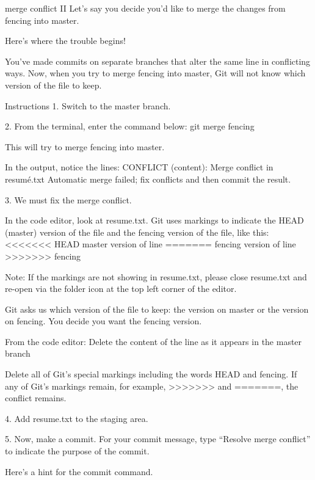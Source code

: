 merge conflict II
    Let’s say you decide you’d like to merge the changes from fencing into master.

    Here’s where the trouble begins!

    You’ve made commits on separate branches that alter the same line in conflicting ways. Now, when you try to merge fencing into master, Git will not know which version of the file to keep.

Instructions
    1.
    Switch to the master branch.

    2.
    From the terminal, enter the command below:
        git merge fencing
    
    This will try to merge fencing into master.

    In the output, notice the lines:
        CONFLICT (content): Merge conflict in resumé.txt
        Automatic merge failed; fix conflicts and then commit the result.

    3.
    We must fix the merge conflict.

    In the code editor, look at resume.txt. Git uses markings to indicate the HEAD (master) version of the file and the fencing version of the file, like this:
        <<<<<<< HEAD
        master version of line
        =======
        fencing version of line
        >>>>>>> fencing

    Note: If the markings are not showing in resume.txt, please close resume.txt and re-open via the folder icon at the top left corner of the editor.

    Git asks us which version of the file to keep: the version on master or the version on fencing. You decide you want the fencing version.

    From the code editor:
        Delete the content of the line as it appears in the master branch
    
        Delete all of Git’s special markings including the words HEAD and fencing. If any of Git’s markings remain, for example, >>>>>>> and =======, the conflict remains.

    4.
    Add resume.txt to the staging area.

    5.
    Now, make a commit. For your commit message, type “Resolve merge conflict” to indicate the purpose of the commit.

    Here’s a hint for the commit command.